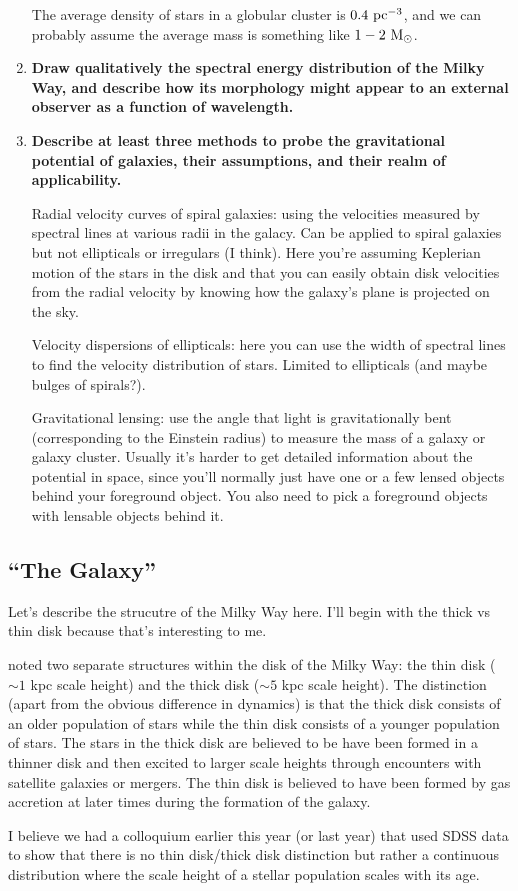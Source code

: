 \begin{enumerate}
      The average density of stars in a globular cluster is $0.4~{\rm pc}^{-3}$, and we can probably assume the average mass is something like $1-2~{\rm M}_\odot$.
\item \textbf{Draw qualitatively the spectral energy distribution of the Milky Way, and describe
      how its morphology might appear to an external observer as a function of wavelength.}
\item \textbf{Describe at least three methods to probe the gravitational potential of galaxies,
      their assumptions, and their realm of applicability.}
      
      Radial velocity curves of spiral galaxies: using the velocities measured by spectral lines at various radii in the galacy. Can be applied to spiral galaxies but not ellipticals or irregulars (I think). Here you're assuming Keplerian motion of the stars in the disk and that you can easily obtain disk velocities from the radial velocity by knowing how the galaxy's plane is projected on the sky.
      
      Velocity dispersions of ellipticals: here you can use the width of spectral lines to find the velocity distribution of stars. Limited to ellipticals (and maybe bulges of spirals?).
      
      Gravitational lensing: use the angle that light is gravitationally bent (corresponding to the Einstein radius) to measure the mass of a galaxy or galaxy cluster. Usually it's harder to get detailed information about the potential in space, since you'll normally just have one or a few lensed objects behind your foreground object. You also need to pick a foreground objects with lensable objects behind it.
      
\end{enumerate}

\subsection{``The Galaxy''}

Let's describe the strucutre of the Milky Way here.  I'll begin with the thick vs thin disk
because that's interesting to me.

 noted two separate structures within the disk of the
Milky Way: the thin disk ($\sim1$ kpc scale height) and the thick disk
($\sim5$ kpc scale height).  The distinction (apart from the obvious difference in dynamics)
is that the thick disk consists of an older population of stars while the thin disk consists
of a younger population of stars.
The stars in the thick disk are believed to be have been formed in a thinner disk and then
excited to larger scale heights through encounters with satellite galaxies or mergers.
The thin disk is believed to have been formed by gas
accretion at later times during the formation of the galaxy.

I believe we had a colloquium earlier this year (or last year) that used SDSS data to show
that there is no thin disk/thick disk distinction but rather a continuous distribution
where the scale height of a stellar population scales with its age.


